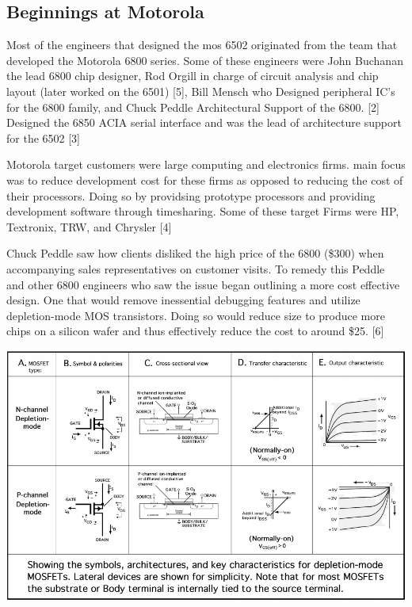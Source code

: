 \documentclass[journal]{IEEEtran}
\begin{document}
\subsection{Beginnings at Motorola}
Most of the engineers that designed the mos 6502 originated from the team 
that developed the Motorola 6800 series.  Some of these engineers were John 
Buchanan the lead 6800 chip designer, Rod Orgill in charge of circuit analysis 
and chip layout (later worked on the 6501) [5], Bill Mensch who Designed 
peripheral IC's for the 6800 family, and Chuck Peddle Architectural Support of the 6800.
[2]  Designed the 6850 ACIA serial interface  and was the lead of architecture support 
for the 6502 [3]

Motorola target customers were large computing and electronics firms.
main focus was to reduce development cost for these firms as opposed to 
reducing the cost of their processors.  Doing so by providsing prototype 
processors and providing development software through timesharing.  
Some of these target Firms were HP, Textronix, TRW, and Chrysler [4]

Chuck Peddle saw how clients disliked the high price of the 6800 (\$300) when 
accompanying sales representatives on customer visits. To remedy this Peddle and
other 6800 engineers who saw the issue began outlining a more cost effective design.
One that would remove inessential debugging features and utilize depletion-mode MOS 
transistors.  Doing so would reduce size to produce more chips on a silicon wafer and 
thus effectively reduce the cost to around \$25. [6]\newline

 \centerline{\includegraphics[scale=0.265]{images/Depletion_Mode_Table.png}}
\end{document}
